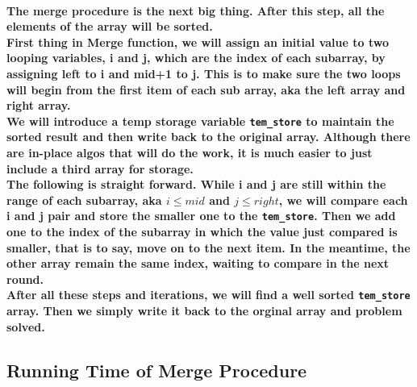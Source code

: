 \documentclass{article}
\begin{document}
\paragraph{The merge procedure is the next big thing. After this step, all the elements of the array will be sorted. \\
First thing in Merge function, we will assign an initial value to two looping variables, i and j, which are the index of each subarray, by assigning left to i and mid+1 to j. This is to make sure the two loops will begin from the first item of each sub array, aka the left array and right array.\\
We will introduce a temp storage variable \texttt{tem\_store} to maintain the sorted result and then write back to the original array. Although there are in-place algos that will do the work, it is much easier to just include a third array for storage.\\
The following is straight forward. While i and j are still within the range of each subarray, aka $i \leq mid$ and $j \leq right$, we will compare each i and j pair and store the smaller one to the \texttt{tem\_store}. 
Then we add one to the index of the subarray in which the value just compared is smaller, that is to say, move on to the next item. In the meantime, the other array remain the same index, waiting to compare in the next round.\\
After all these steps and iterations, we will find a well sorted \texttt{tem\_store} array. Then we simply write it back to the orginal array and problem solved.}

\subsection{Running Time of Merge Procedure}
\end{document}

